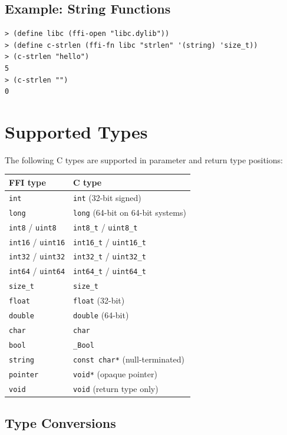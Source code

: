 \subsection{Example: String Functions}

\begin{lstlisting}[style=repl]
> (define libc (ffi-open "libc.dylib"))
> (define c-strlen (ffi-fn libc "strlen" '(string) 'size_t))
> (c-strlen "hello")
5
> (c-strlen "")
0
\end{lstlisting}

\section{Supported Types}

The following C types are supported in parameter and return type positions:

\begin{center}
\begin{tabular}{ll}
\textbf{FFI type} & \textbf{C type} \\
\hline
\texttt{int} & \texttt{int} (32-bit signed) \\
\texttt{long} & \texttt{long} (64-bit on 64-bit systems) \\
\texttt{int8} / \texttt{uint8} & \texttt{int8\_t} / \texttt{uint8\_t} \\
\texttt{int16} / \texttt{uint16} & \texttt{int16\_t} / \texttt{uint16\_t} \\
\texttt{int32} / \texttt{uint32} & \texttt{int32\_t} / \texttt{uint32\_t} \\
\texttt{int64} / \texttt{uint64} & \texttt{int64\_t} / \texttt{uint64\_t} \\
\texttt{size\_t} & \texttt{size\_t} \\
\texttt{float} & \texttt{float} (32-bit) \\
\texttt{double} & \texttt{double} (64-bit) \\
\texttt{char} & \texttt{char} \\
\texttt{bool} & \texttt{\_Bool} \\
\texttt{string} & \texttt{const char*} (null-terminated) \\
\texttt{pointer} & \texttt{void*} (opaque pointer) \\
\texttt{void} & \texttt{void} (return type only) \\
\end{tabular}
\end{center}

\subsection{Type Conversions}


